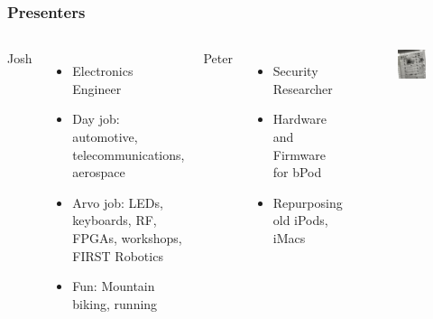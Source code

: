 \documentclass[aspectratio=169, t]{beamer}
\begin{document}
\begin{frame}
	\frametitle{Presenters}
	\begin{columns}
		Josh
			\begin{itemize}
				\item Electronics Engineer
				\item Day job: automotive, telecommunications, aerospace
				\item Arvo job: LEDs, keyboards, RF, FPGAs, workshops, FIRST Robotics
				\item Fun: Mountain biking, running
			\end{itemize}
		\vspace{1em}
		Peter
		\begin{itemize}
			\item Security Researcher
			\item Hardware and Firmware for bPod
			\item Repurposing old iPods, iMacs
		\end{itemize}
		
		\vspace{-8mm}
			\begin{figure}
				\includegraphics[width=0.9\linewidth]{images/bpod_xray.jpeg}
			\end{figure}
			\centering
	\end{columns}
	\end{frame}
\end{document}
